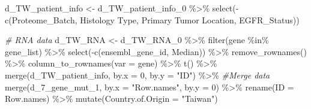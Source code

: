 \documentclass[
]{article}
\newenvironment{Shaded}{\begin{snugshade}}{\end{snugshade}}
\newcommand{\AttributeTok}[1]{\textcolor[rgb]{0.77,0.63,0.00}{#1}}
\newcommand{\CommentTok}[1]{\textcolor[rgb]{0.56,0.35,0.01}{\textit{#1}}}
\newcommand{\DecValTok}[1]{\textcolor[rgb]{0.00,0.00,0.81}{#1}}
\newcommand{\FunctionTok}[1]{\textcolor[rgb]{0.00,0.00,0.00}{#1}}
\newcommand{\NormalTok}[1]{#1}
\newcommand{\OtherTok}[1]{\textcolor[rgb]{0.56,0.35,0.01}{#1}}
\newcommand{\SpecialCharTok}[1]{\textcolor[rgb]{0.00,0.00,0.00}{#1}}
\newcommand{\StringTok}[1]{\textcolor[rgb]{0.31,0.60,0.02}{#1}}
\begin{document}
\begin{Shaded}
\begin{Highlighting}[]
\NormalTok{d\_TW\_patient\_info }\OtherTok{\textless{}{-}}\NormalTok{ d\_TW\_patient\_info\_0 }\SpecialCharTok{\%\textgreater{}\%}
  \FunctionTok{select}\NormalTok{(}\SpecialCharTok{{-}}\FunctionTok{c}\NormalTok{(Proteome\_Batch, }\StringTok{\textasciigrave{}}\AttributeTok{Histology Type}\StringTok{\textasciigrave{}}\NormalTok{, }\StringTok{\textasciigrave{}}\AttributeTok{Primary Tumor Location}\StringTok{\textasciigrave{}}\NormalTok{, EGFR\_Status))}

\CommentTok{\# RNA data}
\NormalTok{d\_TW\_RNA }\OtherTok{\textless{}{-}}\NormalTok{ d\_TW\_RNA\_0 }\SpecialCharTok{\%\textgreater{}\%} 
  \FunctionTok{filter}\NormalTok{(gene }\SpecialCharTok{\%in\%}\NormalTok{ gene\_list) }\SpecialCharTok{\%\textgreater{}\%} 
  \FunctionTok{select}\NormalTok{(}\SpecialCharTok{{-}}\FunctionTok{c}\NormalTok{(ensembl\_gene\_id, Median)) }\SpecialCharTok{\%\textgreater{}\%}
  \FunctionTok{remove\_rownames}\NormalTok{() }\SpecialCharTok{\%\textgreater{}\%}
  \FunctionTok{column\_to\_rownames}\NormalTok{(}\AttributeTok{var =} \StringTok{\textquotesingle{}gene\textquotesingle{}}\NormalTok{) }\SpecialCharTok{\%\textgreater{}\%}
  \FunctionTok{t}\NormalTok{() }\SpecialCharTok{\%\textgreater{}\%}
  \FunctionTok{merge}\NormalTok{(d\_TW\_patient\_info, }\AttributeTok{by.x =} \DecValTok{0}\NormalTok{, }\AttributeTok{by.y =} \StringTok{"ID"}\NormalTok{) }\SpecialCharTok{\%\textgreater{}\%} \CommentTok{\#Merge data}
  \FunctionTok{merge}\NormalTok{(d\_7\_gene\_mut\_1, }\AttributeTok{by.x =} \StringTok{"Row.names"}\NormalTok{, }\AttributeTok{by.y =} \DecValTok{0}\NormalTok{) }\SpecialCharTok{\%\textgreater{}\%}
  \FunctionTok{rename}\NormalTok{(}\AttributeTok{ID =}\NormalTok{ Row.names) }\SpecialCharTok{\%\textgreater{}\%}
  \FunctionTok{mutate}\NormalTok{(}\AttributeTok{Country.of.Origin =} \StringTok{"Taiwan"}\NormalTok{)}
  

\end{Highlighting}
\end{Shaded}
\end{document}
